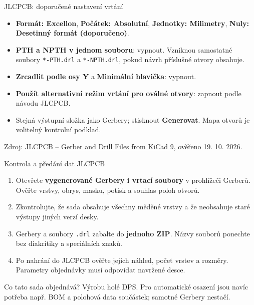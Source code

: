 \documentclass{beamer}
\begin{document}
\begin{frame}[t]{JLCPCB: doporučené nastavení vrtání}
	\small
	\begin{itemize}
		\item \textbf{Formát: Excellon}, \textbf{Počátek: Absolutní}, \textbf{Jednotky: Milimetry}, \textbf{Nuly: Desetinný formát (doporučeno)}.
		\item \textbf{PTH a NPTH v jednom souboru}: vypnout. Vzniknou samostatné soubory \texttt{*-PTH.drl} a \texttt{*-NPTH.drl}, pokud návrh příslušné otvory obsahuje.
		\item \textbf{Zrcadlit podle osy Y} a \textbf{Minimální hlavička}: vypnout.
		\item \textbf{Použít alternativní režim vrtání pro oválné otvory}: zapnout podle návodu JLCPCB.
		\item Stejná výstupní složka jako Gerbery; stisknout \textbf{Generovat}. Mapa otvorů je volitelný kontrolní podklad.
	\end{itemize}
	\vfill
	{\tiny Zdroj: \href{https://jlcpcb.com/help/article/how-to-generate-gerber-and-drill-files-in-kicad-9}{JLCPCB -- Gerber and Drill Files from KiCad 9}, ověřeno 19. 10. 2026.}
\end{frame}

\begin{frame}[t]{Kontrola a předání dat JLCPCB}
	\begin{enumerate}
		\item Otevřete \textbf{vygenerované Gerbery i vrtací soubory} v prohlížeči Gerberů. Ověřte vrstvy, obrys, masku, potisk a souhlas poloh otvorů.
		\item Zkontrolujte, že sada obsahuje všechny měděné vrstvy a že neobsahuje staré výstupy jiných verzí desky.
		\item Gerbery a soubory \texttt{.drl} zabalte do \textbf{jednoho ZIP}. Názvy souborů ponechte bez diakritiky a speciálních znaků.
		\item Po nahrání do JLCPCB ověřte jejich náhled, počet vrstev a rozměry. Parametry objednávky musí odpovídat navržené desce.
	\end{enumerate}
	\begin{block}{Co tato sada objednává?}
	Výrobu holé DPS. Pro automatické osazení jsou navíc potřeba např. BOM a polohová data součástek; samotné Gerbery nestačí.
	\end{block}
\end{frame}
\end{document}
